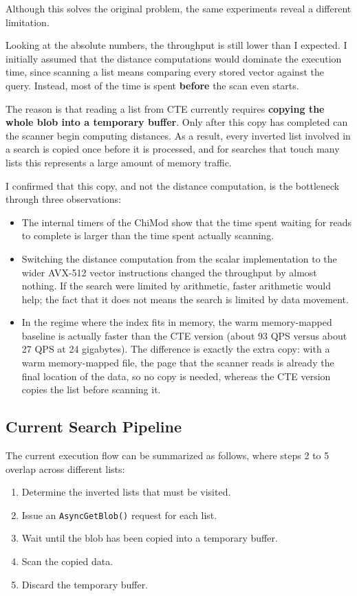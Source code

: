 \documentclass[11pt]{article}
\begin{document}
Although this solves the original problem, the same experiments reveal
a different limitation.

Looking at the absolute numbers, the throughput is still lower than I
expected. I initially assumed that the distance computations would
dominate the execution time, since scanning a list means comparing
every stored vector against the query. Instead, most of the time is
spent \textbf{before} the scan even starts.

The reason is that reading a list from CTE currently requires
\textbf{copying the whole blob into a temporary buffer}. Only after
this copy has completed can the scanner begin computing distances. As
a result, every inverted list involved in a search is copied once
before it is processed, and for searches that touch many lists this
represents a large amount of memory traffic.

I confirmed that this copy, and not the distance computation, is the
bottleneck through three observations:

\begin{itemize}
\item The internal timers of the ChiMod show that the time spent
waiting for reads to complete is larger than the time spent actually
scanning.
\item Switching the distance computation from the scalar
implementation to the wider AVX-512 vector instructions changed the
throughput by almost nothing. If the search were limited by
arithmetic, faster arithmetic would help; the fact that it does not
means the search is limited by data movement.
\item In the regime where the index fits in memory, the warm
memory-mapped baseline is actually faster than the CTE version (about
93 QPS versus about 27 QPS at 24 gigabytes). The difference is exactly
the extra copy: with a warm memory-mapped file, the page that the
scanner reads is already the final location of the data, so no copy is
needed, whereas the CTE version copies the list before scanning it.
\end{itemize}

\subsection{Current Search Pipeline}

The current execution flow can be summarized as follows, where steps 2
to 5 overlap across different lists:

\begin{enumerate}
\item Determine the inverted lists that must be visited.
\item Issue an \texttt{AsyncGetBlob()} request for each list.
\item Wait until the blob has been copied into a temporary buffer.
\item Scan the copied data.
\item Discard the temporary buffer.
\end{enumerate}
\end{document}
